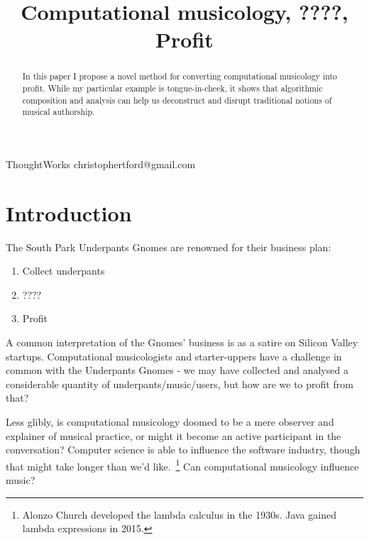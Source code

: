 \documentclass[numbers]{sigplanconf}
\begin{document}
\setlength{\pdfpageheight}{\paperheight}
\setlength{\pdfpagewidth}{\paperwidth}




\title{Computational musicology, ????, Profit}

           {ThoughtWorks}
           {christophertford@gmail.com}

\maketitle

\begin{abstract}
In this paper I propose a novel method for converting computational musicology into profit. While my particular example
is tongue-in-cheek, it shows that algorithmic composition and analysis can help us deconstruct and disrupt
traditional notions of musical authorship.
\end{abstract}



\section{Introduction}

The South Park Underpants Gnomes\cite{Gnomes} are renowned for their business plan:
\begin{enumerate}
    \item Collect underpants
    \item ????
    \item Profit
\end{enumerate}

A common interpretation of the Gnomes' business is as a satire on Silicon Valley startups.
Computational musicologists and starter-uppers have a challenge in common with the Underpants Gnomes
- we may have collected and analysed a considerable quantity of underpants/music/users, but how are we to profit from that?

Less glibly, is computational musicology doomed to be a mere observer and explainer of musical practice, or might it become an
active participant in the conversation? Computer science is able to influence the software industry, though that might take longer
than we'd like.~\footnote{Alonzo Church developed the lambda calculus in the 1930s. Java gained lambda expressions in 2015.}
Can computational musicology influence music?
\end{document}

